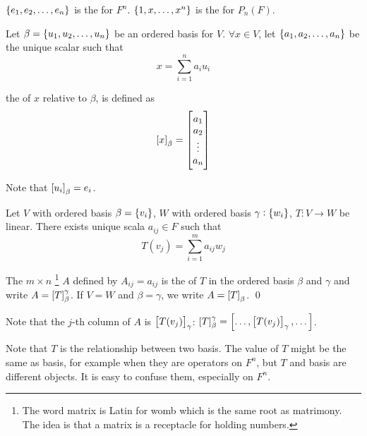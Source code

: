 \begin{definition}
	$\set{e_1, e_2, \dots, e_n}$ is the   for $F^n$. $\set{1, x, \dots, x^n}$ is the   for $P_n (F)$.
\end{definition}

\begin{definition}
	Let $\beta = \set{u_1, u_2, \dots, u_n}$ be an ordered basis for $V$. $\forall x \in V$, let $\set{a_1, a_2, \dots, a_n}$ be the unique scalar such that
	\begin{equation*}
		x = \sum_{i=1}^n a_i u_i
	\end{equation*}
	
	the   of $x$ relative to $\beta$, is defined as 
	\begin{equation}
		\coordinate{x}_\beta = \begin{bmatrix}
		a_1 \\
		a_2 \\
		\vdots \\
		a_n
		\end{bmatrix}
	\end{equation}
	
	Note that $\coordinate{u_i}_\beta = e_i$.
\end{definition}

\begin{definition}
	Let $V$ with ordered basis $\beta=\set{v_i}$, $W$ with ordered basis $\gamma:\set{w_i}$, $T:V \rightarrow W$ be linear. There exists unique scala $a_{ij} \in F$ such that
	\begin{equation}
		T(v_j) = \sum_{i=1}^m a_{ij} w_j
	\end{equation}
	
	The $m \times n$ \footnote{The word matrix is Latin for womb which is the same root as matrimony. The idea is that a matrix is a receptacle for holding numbers. } $A$ defined by $A_{ij}=a_{ij}$ is the   of $T$ in the ordered basis $\beta$ and $\gamma$ and write $A=\coordinate{T}_\beta^\gamma$. If $V = W$ and $\beta = \gamma$, we write $A=\coordinate{T}_\beta$.
	\qed
\end{definition}

	Note that the $j$-th column of $A$ is $\coordinate{T(v_j)}_\gamma$: $\coordinate{T}_\beta^\gamma = \coordinate{\dots, \coordinate{T(v_j)}_\gamma, \dots}$.
	
	Note that $T$ is the relationship between two basis. The value of $T$ might be the same as basis, for example when they are operators on $F^n$, but $T$ and basis are different objects. It is easy to confuse them, especially on $F^n$.
	

